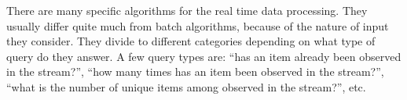There are many specific algorithms for the real time data processing.
They usually differ quite much from batch algorithms, because of the nature of input they consider.
They divide to different categories depending on what type of query do they answer.
A few query types are: ``has an item already been observed in the stream?'', ``how many times has an item been observed in the stream?'', ``what is the number of unique items among observed in the stream?'', etc.



%